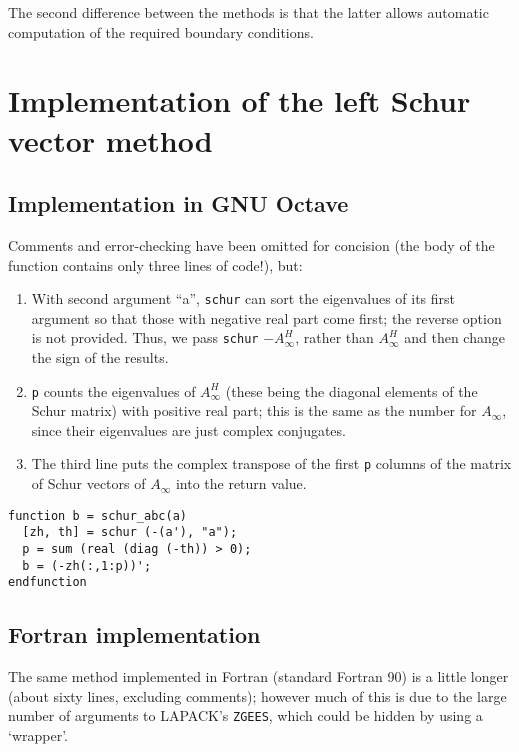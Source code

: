 \documentclass{article}
\begin{document}
The second difference between the methods is that the latter allows
automatic computation of the required boundary conditions.

\appendix

\section{Implementation of the left Schur vector method}

\subsection{Implementation in GNU Octave}

Comments and error-checking have been omitted for concision (the body
of the function contains only three lines of code!), but:
\begin{enumerate}
\item 
 With second argument ``a'', \texttt{schur} can sort the eigenvalues
 of its first argument so that those with negative real part come
 first; the reverse option is not provided.  Thus, we pass
 \texttt{schur} $-A_\infty^H$, rather than $A_\infty^H$ and then
 change the sign of the results. 

\item \texttt{p} counts the eigenvalues of $A_\infty^H$ (these being
the diagonal elements of the Schur matrix) with positive real part;
this is the same as the number for $A_\infty$, since their eigenvalues
are just complex conjugates.

\item The third line puts the complex transpose of the first
\texttt{p} columns of the matrix of Schur vectors of $A_\infty$ into
the return value.
\end{enumerate}

\begin{verbatim}
function b = schur_abc(a)
  [zh, th] = schur (-(a'), "a");
  p = sum (real (diag (-th)) > 0);
  b = (-zh(:,1:p))';
endfunction
\end{verbatim}

\subsection{Fortran implementation}

The same method implemented in Fortran (standard Fortran 90) is a
little longer (about sixty lines, excluding comments); however much of
this is due to the large number of arguments to LAPACK's
\texttt{ZGEES}, which could be hidden by using a `wrapper'.
\end{document}
